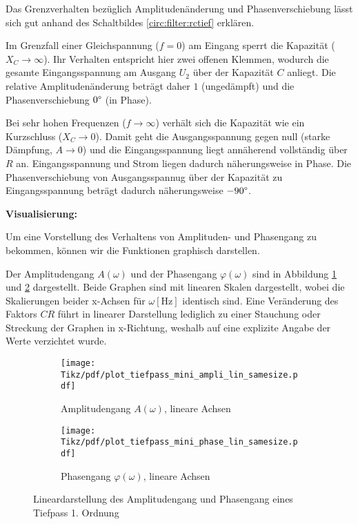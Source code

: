 \begin{frame}[t]
{    Das Grenzverhalten bezüglich Amplitudenänderung und Phasenverschiebung lässt sich gut anhand des 
    Schaltbildes \ref{circ:filter:rctief} erklären. %
    
    Im Grenzfall einer Gleichspannung ($f=0$) am Eingang sperrt die Kapazität ($X_C \rightarrow \infty$). 
    Ihr Verhalten entspricht hier zwei offenen Klemmen, wodurch die gesamte Eingangsspannung am Ausgang $U_2$ über der Kapazität $C$ anliegt. 
    Die relative Amplitudenänderung beträgt daher $1$ (ungedämpft) und die Phasenverschiebung $0\degree$ (in Phase). 

    Bei sehr hohen Frequenzen ($f\rightarrow \infty$) verhält sich die Kapazität wie ein Kurzschluss ($X_C \rightarrow 0$).
    Damit geht die Ausgangsspannung gegen null (starke Dämpfung, $A\rightarrow 0$) und die Eingangsspannung liegt annäherend vollständig über $R$ an.
    Eingangsspannung und Strom liegen dadurch näherungsweise in Phase. Die Phasenverschiebung von Ausgangsspannug über der Kapazität
    zu Eingangsspannung beträgt dadurch näherungsweise $-90\degree$.
    
    \textbf{Visualisierung:}

    Um eine Vorstellung des Verhaltens von Amplituden- und Phasengang zu bekommen, können wir die Funktionen graphisch darstellen. 

    Der Amplitudengang $A(\omega)$ und der Phasengang $\varphi(\omega)$ sind in 
    Abbildung \ref{plot:tiefpass:ampli:mini:lin} und \ref{plot:tiefpass:phase:mini:lin} dargestellt.
    Beide Graphen sind mit linearen Skalen dargestellt, wobei die Skalierungen beider x-Achsen für $\omega \left[\mathrm{Hz}\right]$ identisch sind. 
    Eine Veränderung des Faktors $CR$ führt in linearer Darstellung lediglich zu einer Stauchung oder Streckung der Graphen in x-Richtung, 
    weshalb auf eine explizite Angabe der Werte verzichtet wurde. 

    \begin{figure}[h]\centering
        \begin{subfigure}{0.45\textwidth}\centering
            \texttt{[image: Tikz/pdf/plot\_tiefpass\_mini\_ampli\_lin\_samesize.pdf]}
            \caption{Amplitudengang $A(\omega)$, lineare Achsen}
            \label{plot:tiefpass:ampli:mini:lin}
        \end{subfigure}
        \begin{subfigure}{0.45\textwidth}\centering
        \texttt{[image: Tikz/pdf/plot\_tiefpass\_mini\_phase\_lin\_samesize.pdf]}
            \caption{Phasengang $\varphi(\omega)$, lineare Achsen}
            \label{plot:tiefpass:phase:mini:lin}
        \end{subfigure}
        \caption{Lineardarstellung des Amplitudengang und Phasengang eines Tiefpass 1. Ordnung}
        \label{plot:tiefpass:mini:lin}
    \end{figure}

}
\end{frame}
